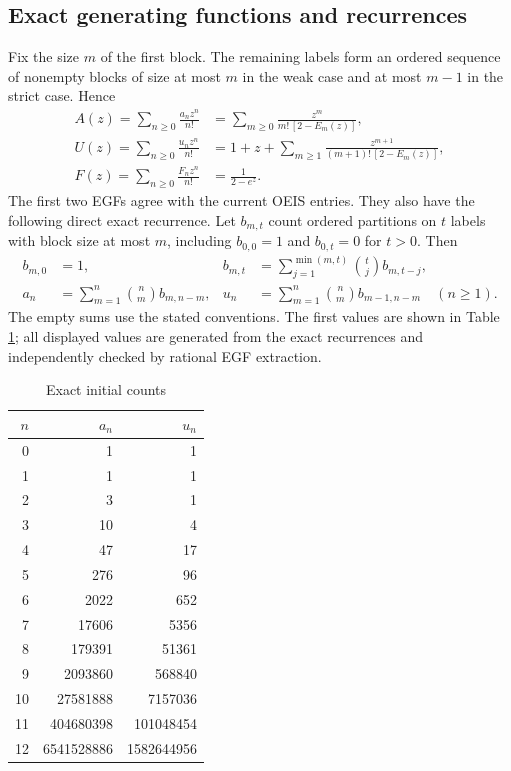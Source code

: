 \documentclass[11pt]{article}
\theoremstyle{remark}\newtheorem{remark}[theorem]{Remark}
\begin{document}
\subsection{Exact generating functions and recurrences}
Fix the size $m$ of the first block. The remaining labels form an ordered sequence of nonempty blocks of size at most $m$ in the weak case and at most $m-1$ in the strict case. Hence
\begin{align}
 A(z)=\sum_{n\geq0}\frac{a_nz^n}{n!}
 &=\sum_{m\geq0}\frac{z^m}{m!\,[2-E_m(z)]},\label{fbm:eq:weakEGF}\\
 U(z)=\sum_{n\geq0}\frac{u_nz^n}{n!}
 &=1+z+\sum_{m\geq1}\frac{z^{m+1}}{(m+1)!\,[2-E_m(z)]},\label{fbm:eq:strictEGF}\\
 F(z)=\sum_{n\geq0}\frac{F_nz^n}{n!}&=\frac1{2-e^z}.\label{fbm:eq:BellEGF}
\end{align}
The first two EGFs agree with the current OEIS entries. They also have the following direct exact recurrence. Let $b_{m,t}$ count ordered partitions on $t$ labels with block size at most $m$, including $b_{0,0}=1$ and $b_{0,t}=0$ for $t>0$. Then
\begin{align}
 b_{m,0}&=1,&
 b_{m,t}&=\sum_{j=1}^{\min(m,t)}\binom tj b_{m,t-j},\label{fbm:eq:boundedrec}\\
 a_n&=\sum_{m=1}^n\binom nm b_{m,n-m},&
 u_n&=\sum_{m=1}^n\binom nm b_{m-1,n-m}\quad(n\geq1).\label{fbm:eq:exactrec}
\end{align}
The empty sums use the stated conventions. The first values are shown in Table \ref{fbm:tab:exact}; all displayed values are generated from the exact recurrences and independently checked by rational EGF extraction.

\begin{table}[htbp]\centering
\caption{Exact initial counts}\label{fbm:tab:exact}
\begin{tabular}{r r r}\toprule
$n$ & $a_n$ & $u_n$ \\\midrule
0 & 1 & 1 \\
1 & 1 & 1 \\
2 & 3 & 1 \\
3 & 10 & 4 \\
4 & 47 & 17 \\
5 & 276 & 96 \\
6 & 2022 & 652 \\
7 & 17606 & 5356 \\
8 & 179391 & 51361 \\
9 & 2093860 & 568840 \\
10 & 27581888 & 7157036 \\
11 & 404680398 & 101048454 \\
12 & 6541528886 & 1582644956 \\
\bottomrule\end{tabular}\end{table}
\end{document}
